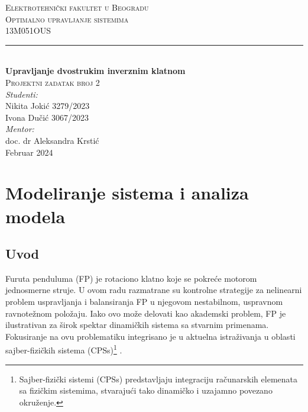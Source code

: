 \documentclass[a4paper,11pt]{article}
\theoremstyle{definition} \newtheorem{deff}{Definicija}[section]
\theoremstyle{definition} \newtheorem{prim}[deff]{Primer}
\theoremstyle{plain} \newtheorem{teor}[deff]{Teorema}
\begin{document}
	
	\begin{titlepage}
		
		\newcommand{\HRule}{\rule{\linewidth}{0.5mm}} 							%
		\center 
		
		\textsc{\LARGE Elektrotehnički fakultet u Beogradu}\\[1cm]
		
		\textsc{\Large Optimalno upravljanje sistemima}\\[0.2cm]
		\textsc{\large 13M051OUS}\\[1cm] 										
		\HRule \\[0.8cm]
		{ \huge \bfseries Upravljanje dvostrukim inverznim klatnom}\\[0.7cm]								%
		\textsc{\large Projektni zadatak broj 2}\\[1cm]
		
		
		\large
		\vfill 
		\emph{Studenti:}\\
		Nikita Jokić 3279/2023\\[0.1cm]
		Ivona Dučić 3067/2023\\[1.5cm]		
		\emph{Mentor:}\\
		doc. dr Aleksandra Krstić\\[0.1cm]									
		{\large Februar 2024}\\[2cm]
	\end{titlepage}
	\tableofcontents
	\newpage
	
	\section{Modeliranje sistema i analiza modela}
	\subsection{Uvod} 
	
	Furuta penduluma (FP) je rotaciono klatno koje se pokreće motorom jednosmerne struje. U ovom radu razmatrane su kontrolne strategije za nelinearni problem uspravljanja i balansiranja FP u njegovom nestabilnom, uspravnom ravnotežnom položaju. Iako ovo može delovati kao akademski problem, FP je ilustrativan za širok spektar dinamičkih sistema sa stvarnim primenama. Fokusiranje na ovu problematiku integrisano je u aktuelna istraživanja u oblasti sajber-fizičkih sistema (CPSs)\footnote{Sajber-fizički sistemi (CPSs) predstavljaju integraciju računarskih elemenata sa fizičkim sistemima, stvarajući tako dinamičko i uzajamno povezano okruženje.} \cite{inicijalna}. \\ 
	
\end{document}
